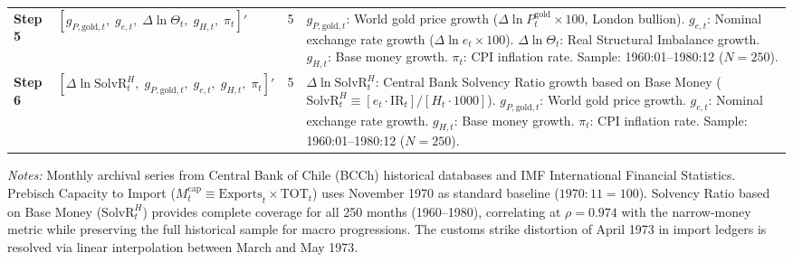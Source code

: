 \begin{table}[htbp]
\begin{tabularx}{\textwidth}{llc>{\RaggedRight}X}
\addlinespace[0.3em]
\textbf{Step 5} & $[g_{P,\text{gold},t}, \; g_{e,t}, \; \Delta \ln \Theta_t, \; g_{H,t}, \; \pi_t]'$ & 5 & $g_{P,\text{gold},t}$: World gold price growth ($\Delta \ln P^{\text{gold}}_t \times 100$, London bullion). \newline $g_{e,t}$: Nominal exchange rate growth ($\Delta \ln e_t \times 100$). \newline $\Delta \ln \Theta_t$: Real Structural Imbalance growth. \newline $g_{H,t}$: Base money growth. \newline $\pi_t$: CPI inflation rate. \newline Sample: 1960:01--1980:12 ($N=250$). \\
\addlinespace[0.3em]
\textbf{Step 6} & $[\Delta \ln \text{SolvR}_t^H, \; g_{P,\text{gold},t}, \; g_{e,t}, \; g_{H,t}, \; \pi_t]'$ & 5 & $\Delta \ln \text{SolvR}_t^H$: Central Bank Solvency Ratio growth based on Base Money ($\text{SolvR}_t^H \equiv [e_t \cdot \text{IR}_t] / [H_t \cdot 1000]$). \newline $g_{P,\text{gold},t}$: World gold price growth. \newline $g_{e,t}$: Nominal exchange rate growth. \newline $g_{H,t}$: Base money growth. \newline $\pi_t$: CPI inflation rate. \newline Sample: 1960:01--1980:12 ($N=250$). \\
\bottomrule
\end{tabularx}
\begin{minipage}{\textwidth}
\vspace{0.3em}
\footnotesize \textit{Notes:} Monthly archival series from Central Bank of Chile (BCCh) historical databases and IMF International Financial Statistics. Prebisch Capacity to Import ($M^{\text{cap}}_t \equiv \text{Exports}_t \times \text{TOT}_t$) uses November 1970 as standard baseline ($1970:11 = 100$). Solvency Ratio based on Base Money ($\text{SolvR}_t^H$) provides complete coverage for all 250 months (1960--1980), correlating at $\rho = 0.974$ with the narrow-money metric while preserving the full historical sample for macro progressions. The customs strike distortion of April 1973 in import ledgers is resolved via linear interpolation between March and May 1973.
\end{minipage}
\end{table}
